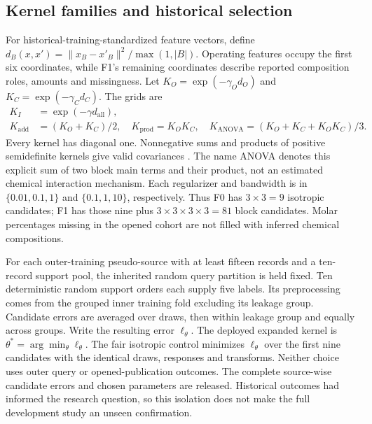 \subsection{Kernel families and historical selection}
For historical-training-standardized feature vectors, define $d_B(x,x')=\|x_B-x'_B\|^2/\max(1,|B|)$. Operating features occupy the first six coordinates, while F1's remaining coordinates describe reported composition roles, amounts and missingness. Let $K_O=\exp(-\gamma_Od_O)$ and $K_C=\exp(-\gamma_Cd_C)$. The grids are
\begin{align}
K_I&=\exp(-\gamma d_{\mathrm{all}}),\\
K_{\mathrm{add}}&=(K_O+K_C)/2,\quad
K_{\mathrm{prod}}=K_OK_C,\quad
K_{\mathrm{ANOVA}}=(K_O+K_C+K_OK_C)/3.
\end{align}
Every kernel has diagonal one. Nonnegative sums and products of positive semidefinite kernels give valid covariances \cite{gpml}. The name ANOVA denotes this explicit sum of two block main terms and their product, not an estimated chemical interaction mechanism. Each regularizer and bandwidth is in $\{0.01,0.1,1\}$ and $\{0.1,1,10\}$, respectively. Thus F0 has $3\times3=9$ isotropic candidates; F1 has those nine plus $3\times3\times3\times3=81$ block candidates. Molar percentages missing in the opened cohort are not filled with inferred chemical compositions.

For each outer-training pseudo-source with at least fifteen records and a ten-record support pool, the inherited random query partition is held fixed. Ten deterministic random support orders each supply five labels. Its preprocessing comes from the grouped inner training fold excluding its leakage group. Candidate errors are averaged over draws, then within leakage group and equally across groups. Write the resulting error $\ell_\theta$. The deployed expanded kernel is $\theta^*=\arg\min_\theta\ell_\theta$. The fair isotropic control minimizes $\ell_\theta$ over the first nine candidates with the identical draws, responses and transforms. Neither choice uses outer query or opened-publication outcomes. The complete source-wise candidate errors and chosen parameters are released. Historical outcomes had informed the research question, so this isolation does not make the full development study an unseen confirmation.

